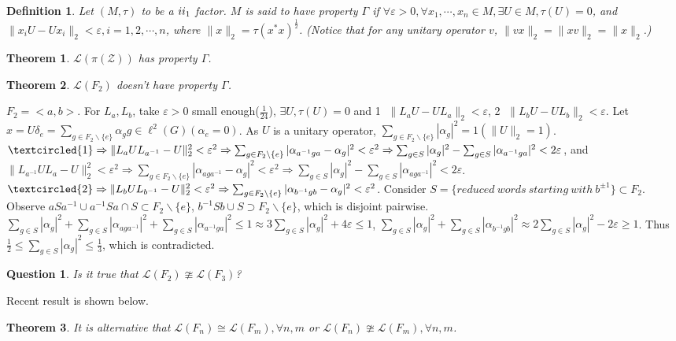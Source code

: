 \documentclass[12pt]{article}
\newtheorem{definition}{Definition}
\newtheorem{question}{Question}
\newtheorem{theorem}{Theorem}
\begin{document}
\begin{definition}
Let $(M,\tau)$ to be a $\uppercase\expandafter{\romannumeral 2}_1$ factor. $M$ is said to have property $\Gamma$ if $\forall \varepsilon>0,\forall x_1,\cdots,x_n\in M,\exists U\in M,\tau(U)=0$, and $\|x_iU-Ux_i\|_2<\varepsilon,i=1,2,\cdots,n$, where $\|x\|_2=\tau(x^*x)^{\frac{1}{2}} $. (Notice that for any unitary operator $v$, $\|vx\|_2=\|xv\|_2=\|x\|_2$.)
\end{definition}
\begin{theorem}
$\mathcal L(\pi(\mathcal Z))$ has property $\Gamma$.
\end{theorem}
\begin{theorem}
$\mathcal L(F_2)$ doesn't have property $\Gamma$.
\end{theorem}
$F_2=<a,b>$. For $L_a,L_b$, take $\varepsilon>0$ small enough($\frac{1}{24}$), $\exists U, \tau(U)=0$ and \textcircled{1} $\|L_aU-UL_a\|_2<\varepsilon$, \textcircled{2} $\|L_bU-UL_b\|_2<\varepsilon $. Let $x=U\delta_e=\sum_{g\in F_2\backslash\{e\}}\alpha_gg\in\ell^2(G)(\alpha_e=0)$. As $U$ is a unitary operator, $\sum_{g\in F_2\backslash\{e\}}|\alpha_g|^2=1(\|U\|_2=1)$. $\textcircled{1}\Rightarrow\|L_aUL_{a^{-1}}-U\|_2^2<\varepsilon^2\Rightarrow\sum_{g\in F_2\backslash\{e\}}|\alpha_{a^{-1}ga}-\alpha_g |^2<\varepsilon^2\Rightarrow\sum_{g\in S}|\alpha_g|^2-\sum_{g\in S}|\alpha_{a^{-1}ga} |^2<2\varepsilon$, and $\|L_{a^{-1}}UL_a-U\|_2^2<\varepsilon^2\Rightarrow\sum_{g\in F_2\backslash\{e\}}|\alpha_{aga^{-1}}-\alpha_g |^2<\varepsilon^2\Rightarrow\sum_{g\in S}|\alpha_g|^2-\sum_{g\in S}|\alpha_{aga^{-1}} |^2<2\varepsilon$. $\textcircled{2}\Rightarrow\|L_bUL_{b^{-1}}-U \|_2^2<\varepsilon^2\Rightarrow\sum_{g\in F_2\backslash\{e\}}|\alpha_{b^{-1}gb}-\alpha_g|^2<\varepsilon^2$. Consider $S=\{reduced\ words\ starting\ with\ b^{\pm1} \} \subset F_2$. Observe $aSa^{-1}\cup a^{-1}Sa\cap S \subset F_2\backslash\{e\}$, $b^{-1}Sb\cup S\supset F_2\backslash\{e\}$, which is disjoint pairwise. $\sum_{g\in S}|\alpha_g |^2+\sum_{g\in S}|\alpha_{aga^{-1}} |^2+\sum_{g\in S}|\alpha_{a^{-1}ga} |^2\le 1\approx 3\sum_{g\in S}|\alpha_g |^2+4\varepsilon\le 1$, $\sum_{g\in S}|\alpha_g |^2+\sum_{g\in S}|\alpha_{b^{-1}gb} |^2\approx2\sum_{g\in S}|\alpha_g |^2-2\varepsilon \ge1 $. Thus $\frac{1}{2}\le\sum_{g\in S}|\alpha_g|^2\le\frac{1}{3}$, which is contradicted.

\begin{question}
Is it true that $\mathcal L(F_2)\ncong\mathcal L(F_3)$?
\end{question}
Recent result is shown below.
\begin{theorem}
It is alternative that $\mathcal L(F_n)\cong\mathcal L(F_m),\forall n,m$ or $\mathcal L(F_n)\ncong\mathcal L(F_m),\forall n,m $.
\end{theorem}
\end{document}
